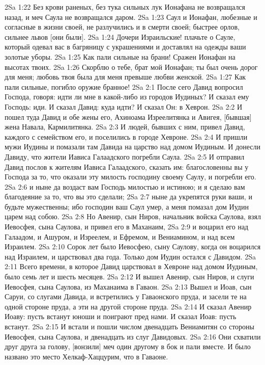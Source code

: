 2Sa 1:22  Без крови раненых, без тука сильных лук Ионафана не возвращался назад, и меч Саула не возвращался даром.
2Sa 1:23  Саул и Ионафан, любезные и согласные в жизни своей, не разлучились и в смерти своей; быстрее орлов, сильнее львов [они были].
2Sa 1:24  Дочери Израильские! плачьте о Сауле, который одевал вас в багряницу с украшениями и доставлял на одежды ваши золотые уборы.
2Sa 1:25  Как пали сильные на брани! Сражен Ионафан на высотах твоих.
2Sa 1:26  Скорблю о тебе, брат мой Ионафан; ты был очень дорог для меня; любовь твоя была для меня превыше любви женской.
2Sa 1:27  Как пали сильные, погибло оружие бранное!
2Sa 2:1  После сего Давид вопросил Господа, говоря: идти ли мне в какой-либо из городов Иудиных? И сказал ему Господь: иди. И сказал Давид: куда идти? И сказал Он: в Хеврон.
2Sa 2:2  И пошел туда Давид и обе жены его, Ахиноама Изреелитянка и Авигея, [бывшая] жена Навала, Кармилитянка.
2Sa 2:3  И людей, бывших с ним, привел Давид, каждого с семейством его, и поселились в городе Хевроне.
2Sa 2:4  И пришли мужи Иудины и помазали там Давида на царство над домом Иудиным. И донесли Давиду, что жители Иависа Галаадского погребли Саула.
2Sa 2:5  И отправил Давид послов к жителям Иависа Галаадского, сказать им: благословенны вы у Господа за то, что оказали эту милость господину своему Саулу, и погребли его.
2Sa 2:6  и ныне да воздаст вам Господь милостью и истиною; и я сделаю вам благодеяние за то, что вы это сделали;
2Sa 2:7  ныне да укрепятся руки ваши, и будьте мужественны; ибо господин ваш Саул умер, а меня помазал дом Иудин царем над собою.
2Sa 2:8  Но Авенир, сын Ниров, начальник войска Саулова, взял Иевосфея, сына Саулова, и привел его в Маханаим,
2Sa 2:9  и воцарил его над Галаадом, и Ашуром, и Изреелем, и Ефремом, и Вениамином, и над всем Израилем.
2Sa 2:10  Сорок лет было Иевосфею, сыну Саулову, когда он воцарился над Израилем, и царствовал два года. Только дом Иудин остался с Давидом.
2Sa 2:11  Всего времени, в которое Давид царствовал в Хевроне над домом Иудиным, было семь лет и шесть месяцев.
2Sa 2:12  И вышел Авенир, сын Ниров, и слуги Иевосфея, сына Саулова, из Маханаима в Гаваон.
2Sa 2:13  Вышел и Иоав, сын Саруи, со слугами Давида, и встретились у Гаваонского пруда, и засели те на одной стороне пруда, а эти на другой стороне пруда.
2Sa 2:14  И сказал Авенир Иоаву: пусть встанут юноши и поиграют пред нами. И сказал Иоав: пусть встанут.
2Sa 2:15  И встали и пошли числом двенадцать Вениамитян со стороны Иевосфея, сына Саулова, и двенадцать из слуг Давидовых.
2Sa 2:16  Они схватили друг друга за голову, [вонзили] меч один другому в бок и пали вместе. И было названо это место Хелкаф-Хаццурим, что в Гаваоне.
